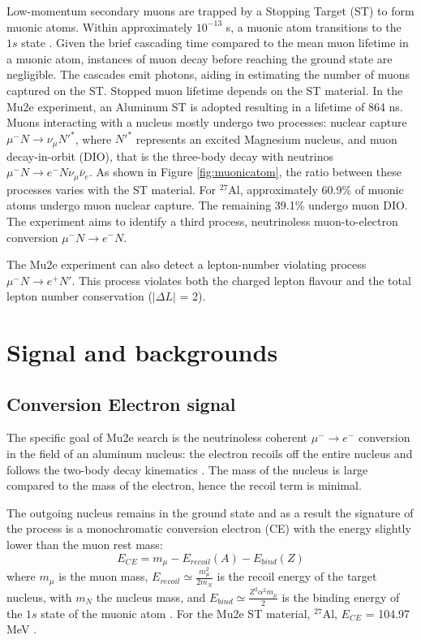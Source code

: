 Low-momentum secondary muons are trapped by a Stopping Target (ST) to form muonic atoms. 
Within approximately $10^{-13}$ s, 
a muonic atom transitions to the $1s$ state \cite{MEASDAY2001243}. 
Given the brief cascading time compared to the mean muon lifetime in a muonic atom,  
instances of muon decay before reaching the ground state are negligible. 
The cascades emit photons, aiding in estimating the number of muons captured 
on the ST. 
Stopped muon lifetime depends on the ST material.
In the Mu2e experiment, an Aluminum ST is adopted resulting in a lifetime of 
864 ns. Muons interacting with a nucleus mostly undergo two processes: 
nuclear capture $\mu^- N \rightarrow \nu_\mu N'^* $, where $N'^*$ represents an excited 
Magnesium nucleus, and muon decay-in-orbit (DIO), 
that is the three-body decay with neutrinos $\mu ^- N \rightarrow e^- N \nu_\mu \bar{\nu}_e$. 
As shown in Figure \ref{fig:muonicatom}, the ratio between these 
processes varies with the ST material. For $^{27}$Al, approximately 60.9\% 
of muonic atoms undergo muon nuclear capture. The remaining 39.1\% undergo muon DIO. 
The experiment aims to identify a third process, neutrinoless muon-to-electron 
conversion $\mu^- N \rightarrow e^- N $. 

The Mu2e experiment can also detect a lepton-number violating process 
$\mu^- N \rightarrow e^+ N'$.
This process violates both the charged lepton flavour and the total lepton number 
conservation ($|\Delta L|$ = 2). 


\section{Signal and backgrounds}\label{sigandbkg}
\subsection{Conversion Electron signal}

The specific goal of Mu2e search is the neutrinoless coherent $\mu^- \rightarrow e^-$
conversion in the field of an aluminum nucleus: the electron recoils off the 
entire nucleus and follows the two-body decay kinematics \cite{bartoszek2015mu2e}. The mass of the nucleus is large compared to the 
mass of the electron, hence the recoil term is minimal.

The outgoing nucleus 
remains in the ground state and as a result the signature of the process is a monochromatic conversion electron 
(CE) with the energy slightly lower than the muon rest mass:
\begin{equation}
    E_{CE} = m_\mu - E_{recoil}(A) - E_{bind}(Z) 
\end{equation}
where $m_\mu$ is the muon mass, $E_{recoil}\simeq \frac{m^2_\mu}{2 m_N}$ is 
the recoil energy of the target nucleus, with $m_N$ the nucleus mass, and 
$E_{bind}\simeq \frac{Z^2 \alpha^2 m_\mu}{2}$ is the binding energy of the 
$1s$ state of the muonic atom \cite{universe9010054}. For the Mu2e 
ST material, $^{27}$Al, $E_{CE}$ = 104.97 MeV \cite{PhysRevD.84.013006}.

